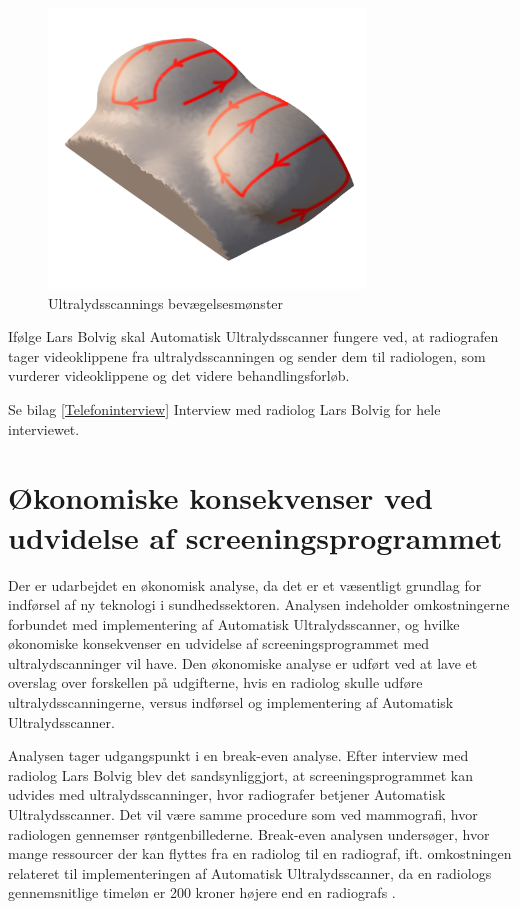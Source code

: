 \begin{figure}[H]
    \centering
    \includegraphics[width=0.75\textwidth]{figurer/d/probebevagelse}
    \caption{Ultralydsscannings bevægelsesmønster}
    \label{Probensbevagelse}
\end{figure}

Ifølge Lars Bolvig skal Automatisk Ultralydsscanner fungere ved, at radiografen tager videoklippene fra ultralydsscanningen og sender dem til radiologen, som vurderer videoklippene og det videre behandlingsforløb.

Se bilag \ref{Telefoninterview} Interview med radiolog Lars Bolvig for hele interviewet. 

\section{Økonomiske konsekvenser ved udvidelse af screeningsprogrammet} 
Der er udarbejdet en økonomisk analyse, da det er et væsentligt grundlag for indførsel af ny teknologi i sundhedssektoren. Analysen indeholder omkostningerne forbundet med implementering af Automatisk Ultralydsscanner, og hvilke økonomiske konsekvenser en udvidelse af screeningsprogrammet med ultralydscanninger vil have. Den økonomiske analyse er udført ved at lave et overslag over forskellen på udgifterne, hvis en radiolog skulle udføre ultralydsscanningerne, versus indførsel og implementering af Automatisk Ultralydsscanner. 

Analysen tager udgangspunkt i en break-even analyse.  Efter interview med radiolog Lars Bolvig blev det sandsynliggjort, at screeningsprogrammet kan udvides med ultralydsscanninger, hvor radiografer betjener Automatisk Ultralydsscanner. Det vil være samme procedure som ved mammografi, hvor radiologen gennemser røntgenbillederne. Break-even analysen undersøger, hvor mange ressourcer der kan flyttes fra en radiolog til en radiograf, ift. omkostningen relateret til implementeringen af Automatisk Ultralydsscanner, da en radiologs gennemsnitlige timeløn er 200 kroner højere end en radiografs \cite{Lon}.

